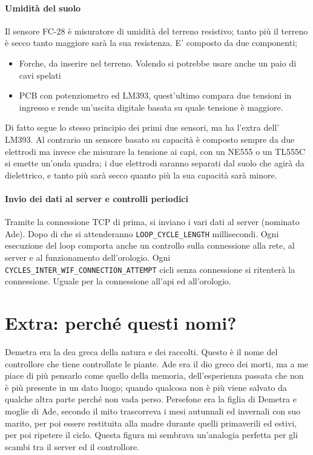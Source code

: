 \documentclass{article}
\begin{document}
    \paragraph{Umidità del suolo} Il sensore FC-28 è misuratore di umidità del terreno resistivo; tanto più il terreno è secco tanto maggiore sarà la sua resistenza. E' composto da due componenti;
    \begin{itemize}
        \item Forche, da inserire nel terreno. Volendo si potrebbe usare anche un paio di cavi spelati \\
        \item PCB con potenziometro ed LM393, quest'ultimo compara due tensioni in ingresso e rende un'uscita digitale basata su quale tensione è maggiore. 
    \end{itemize}
    Di fatto segue lo stesso principio dei primi due sensori, ma ha l'extra dell' LM393.
    Al contrario un sensore basato su capacità è composto sempre da due elettrodi ma invece che misurare la tensione ai capi, con un NE555 o un TL555C si emette un'onda quadra; i due elettrodi saranno separati dal suolo che agirà da dielettrico, e tanto più sarà secco quanto più la sua capacità sarà minore. 
    \paragraph{Invio dei dati al server e controlli periodici} Tramite la connessione TCP di prima, si inviano i vari dati al server (nominato Ade). Dopo di che si attenderanno \texttt{LOOP\_CYCLE\_LENGTH} millisecondi. Ogni esecuzione del loop comporta anche un controllo sulla connessione alla rete, al server e al funzionamento dell'orologio. Ogni \texttt{CYCLES\_INTER\_WIF\_CONNECTION\_ATTEMPT} cicli senza connessione si ritenterà la connessione. Uguale per la connessione all'api ed all'orologio.

    \section{Extra: perché questi nomi?}
    Demetra era la dea greca della natura e dei raccolti. Questo è il nome del controllore che tiene controllate le piante.
    Ade era il dio greco dei morti, ma a me piace di più pensarlo come quello della memoria, dell'esperienza passata che non è più presente in un dato luogo; quando qualcosa non è più viene salvato da qualche altra parte perché non vada perso.
    Persefone era la figlia di Demetra e moglie di Ade, secondo il mito trascorreva i mesi autunnali ed invernali con suo marito, per poi essere restituita alla madre durante quelli primaverili ed estivi, per poi ripetere il ciclo. Questa figura mi sembrava un'analogia perfetta per gli scambi tra il server ed il controllore.
\end{document}
